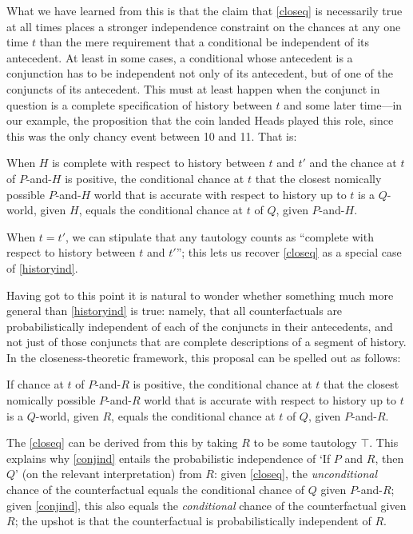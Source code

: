 \documentclass[If.tex]{subfiles}
\begin{document}
What we have learned from this is that the claim that \ref{closeq} is necessarily true at all times places a stronger independence constraint on the chances at any one time $t$ than the mere requirement that a conditional be independent of its antecedent.  At least in some cases, a conditional whose antecedent is a conjunction has to be independent not only of its antecedent, but of one of the conjuncts of its antecedent.  This must at least happen when the conjunct in question is a complete specification of history between $t$ and some later time---in our example, the proposition that the coin landed Heads played this role, since this was the only chancy event between 10 and 11.  That is:
\begin{prop}
	 \label{historyind}
	When $H$ is complete with respect to history between $t$ and $t'$ and the chance at $t$ of $P$-and-$H$ is positive, the conditional chance at $t$ that the closest nomically possible $P$-and-$H$ world that is accurate with respect to history up to $t$ is a $Q$-world, given $H$, equals the conditional chance at $t$ of $Q$, given $P$-and-$H$.	
\end{prop}
When $t = t'$, we can stipulate that any tautology counts as “complete with respect to history between $t$ and $t'$”; this lets us recover \ref{closeq} as a special case of \ref{historyind}.  

Having got to this point it is natural to wonder whether something much more general than \ref{historyind} is true: namely, that all counterfactuals are probabilistically independent of each of the conjuncts in their antecedents, and not just of those conjuncts that are complete descriptions of a segment of history.  In the closeness-theoretic framework, this proposal can be spelled out as follows:
\begin{prop}
	 \label{conjind}
	If chance at $t$ of $P$-and-$R$ is positive, the conditional chance at $t$ that the closest nomically possible $P$-and-$R$ world that is accurate with respect to history up to $t$ is a $Q$-world, given $R$, equals the conditional chance at $t$ of $Q$, given $P$-and-$R$.	
\end{prop}
The \ref{closeq} can be derived from this by taking $R$ to be some tautology $\top$.  This explains why \ref{conjind} entails the probabilistic independence of ‘If $P$ and $R$, then $Q$’ (on the relevant interpretation) from $R$: given \ref{closeq}, the \emph{unconditional} chance of the counterfactual equals the conditional chance of $Q$ given $P$-and-$R$; given \ref{conjind}, this also equals the \emph{conditional} chance of the counterfactual given $R$; the upshot is that the counterfactual is probabilistically independent of $R$.  
\end{document}
